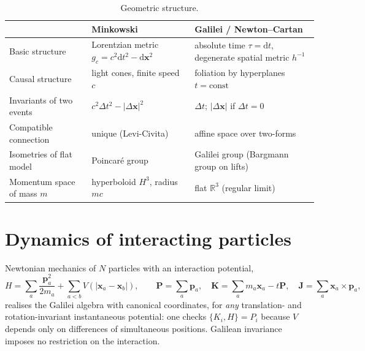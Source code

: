 \documentclass[11pt,a4paper]{article}
\newcommand{\dd}{\mathrm{d}}
\newcommand{\R}{\mathbb{R}}
\newcommand{\bx}{\mathbf{x}}
\newcommand{\bp}{\mathbf{p}}
\newcommand{\bJ}{\mathbf{J}}
\newcommand{\bP}{\mathbf{P}}
\theoremstyle{plain}
\theoremstyle{definition}
\theoremstyle{remark}
\begin{document}
\begin{table}[ht]
\centering
\renewcommand{\arraystretch}{1.25}
\begin{tabular}{@{}>{\raggedright\arraybackslash}p{3.2cm}>{\raggedright\arraybackslash}p{5.6cm}>{\raggedright\arraybackslash}p{5.6cm}@{}}
\toprule
 & Minkowski & Galilei / Newton--Cartan \\
\midrule
Basic structure & Lorentzian metric $g_c=c^2\dd t^2-\dd\bx^2$ & absolute time $\tau=\dd t$, degenerate spatial metric $h^{-1}$ \\
Causal structure & light cones, finite speed $c$ & foliation by hyperplanes $t=\text{const}$ \\
Invariants of two events & $c^2\Delta t^2-|\Delta\bx|^2$ & $\Delta t$; $|\Delta\bx|$ if $\Delta t=0$ \\
Compatible connection & unique (Levi-Civita) & affine space over two-forms \\
Isometries of flat model & Poincar\'e group & Galilei group (Bargmann group on lifts) \\
Momentum space of mass $m$ & hyperboloid $H^3$, radius $mc$ & flat $\R^3$ (regular limit) \\
\bottomrule
\end{tabular}
\caption{Geometric structure.}\label{tab:geometry}
\end{table}

\section{Dynamics of interacting particles}\label{sec:dynamics}
Newtonian mechanics of $N$ particles with an interaction potential,
\begin{equation}
H=\sum_a\frac{\bp_a^2}{2m_a}+\sum_{a<b}V(|\bx_a-\bx_b|),\qquad
\bP=\sum_a\bp_a,\quad \mathbf K=\sum_a m_a\bx_a-t\bP,\quad \bJ=\sum_a\bx_a\times\bp_a,
\end{equation}
realises the Galilei algebra with canonical coordinates, for \emph{any} translation- and
rotation-invariant instantaneous potential: one checks $\{K_i,H\}=P_i$ because $V$ depends only on
differences of simultaneous positions. Galilean invariance imposes no restriction on the
interaction.
\end{document}
